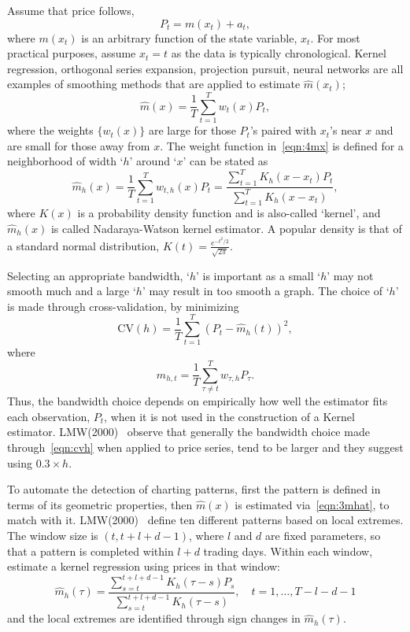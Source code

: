 Assume that price follows,
	\begin{equation} \label{eqn:4pt}
	P_{t} = m(x_{t}) + a_{t},
	\end{equation}
where $m(x_{t})$ is an arbitrary function of the state variable, $x_{t}$. For most practical purposes, assume $x_{t}= t$ as the data is typically chronological. Kernel regression, orthogonal series expansion, projection pursuit, neural networks are all examples of smoothing methods that are applied to estimate $\hat{m}(x_{t})$;
	\begin{equation} \label{eqn:4mx}
	\hat{m}(x) = \frac{1}{T} \sum_{t=1}^Tw_{t}(x)P_{t},
	\end{equation}
where the weights $\{w_{t}(x)\}$ are large for those $P_{t}$'s paired with $x_{t}$'s near $x$ and are small for those away from $x$. The weight function in~\eqref{eqn:4mx} is defined for a neighborhood of width `$h$'  around `$x$' can be stated as
	\begin{equation} \label{eqn:3mhat}
	\hat{m}_{h}(x) = \frac{1}{T}\sum_{t=1}^T w_{t,h}(x)P_{t} = \dfrac{\sum_{t=1}^T K_{h}(x-x_{t})P_{t}}{\sum_{t=1}^T K_{h}(x-x_{t})},
	\end{equation}
where $K(x)$ is a probability density function and is also-called `kernel', and $\hat{m}_{h}(x)$ is called Nadaraya-Watson kernel estimator. A popular density is that of a standard normal distribution, $K(t)=\frac{e^{-t^2/2}}{\sqrt{2\pi}}$.


Selecting an appropriate bandwidth, `$h$' is important as a small `$h$' may not smooth much and a large `$h$' may result in too smooth a graph. The choice of `$h$' is made through cross-validation, by minimizing
	\begin{equation} \label{eqn:cvh}
	\text{CV}(h) = \frac{1}{T}\sum_{t=1}^T (P_{t} - \hat{m}_{h}(t))^2,
	\end{equation}
where
	\begin{equation} \label{eqn:mht}
	\hat{m}_{h,t} = \frac{1}{T}\sum_{\tau\not=t}^T w_{\tau,h}P_{\tau}.
	\end{equation}
Thus, the bandwidth choice depends on empirically how well the estimator fits each observation, $P_{t}$, when it is not used in the construction of a Kernel estimator. LMW(2000)~\cite{LoMWang} observe that generally the bandwidth choice made through~\eqref{eqn:cvh} when applied to price series, tend to be larger and they suggest using $0.3 \times h$.


To automate the detection of charting patterns, first the pattern is defined in terms of its geometric properties, then $\hat{m}(x)$ is estimated via~\eqref{eqn:3mhat}, to match with it. LMW(2000)~\cite{LoMWang} define ten different patterns based on local extremes. The window size is $(t,t+l+d-1)$, where $l$ and $d$ are fixed parameters, so that a pattern is completed within $l+d$ trading days. Within each window, estimate  a kernel regression using prices in that window:
	\begin{equation} \label{eqn:longhat}
	\hat{m}_{h}(\tau) = \dfrac{\sum_{s = t}^{t+l+d-1}K_{h}(\tau - s)P_{s}}{\sum_{s = t}^{t+l+d-1}K_{h}(\tau - s)}, \quad t = 1,\ldots , T-l-d-1
	\end{equation}
and the local extremes are identified through sign changes in $\hat{m}_{h}(\tau)$.


